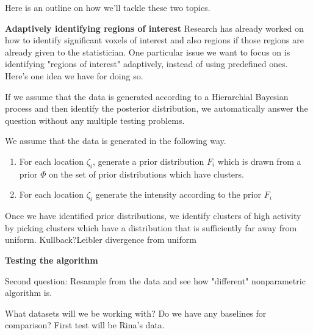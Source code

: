 \documentclass[12pt]{article}
\begin{document}
Here is an outline on how we'll tackle these two topics. 

{\bf Adaptively identifying regions of interest} 
Research has already worked on how to identify significant voxels of interest and also regions if those
regions are already given to the statistician.  One particular issue we want to focus on 
is identifying "regions of interest" adaptively, instead of using predefined ones.  
Here's one idea we have for doing so. 

If we assume that the data is generated according to a Hierarchial Bayesian 
process and then identify the posterior distribution, we automatically answer the question
without any multiple testing problems. 

We assume that the data is generated in the following way. 
\begin{enumerate}
\item  For each location $\zeta_i$, generate a prior distribution $F_i$ which is drawn 
from a prior $\Phi$ on the set of prior distributions which have clusters. 


\item For each location $\zeta_i$ generate the intensity according to the prior $F_i$ 
\end{enumerate}



Once we have identified prior distributions, we identify clusters of high activity 
by picking clusters which have a distribution that is sufficiently far
away from uniform.  Kullback?Leibler divergence from uniform 


{\bf Testing the algorithm } 

Second question: 
Resample from the data and see how "different" nonparametric algorithm is. 




What datasets will we be working with?  Do we have any baselines for comparison? 
First test will be Rina's data. 


 

\end{document}
